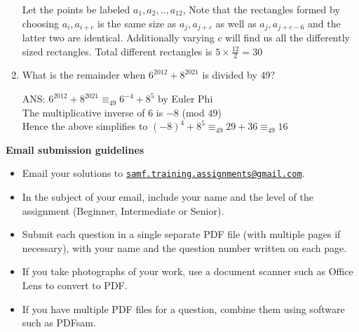 \documentclass{article}
\begin{document}
\begin{enumerate}[1.]
Let the points be labeled $a_1,a_2,..,a_{12}$, Note that the rectangles formed by choosing $a_i,a_{i+c}$ is the same size as $a_j,a_{j+c}$ as well as $a_j,a_{j+c-6}$ and the latter two are identical. Additionally varying $c$ will find us all the differently sized rectangles. Total different rectangles is $5\times\frac{12}{2} = 30$

\vspace{6pt}
\item %
What is the remainder when $6^{2012} + 8^{2021}$ is divided by 49?
\medskip
\item[ANS:]
$6^{2012} + 8^{2021} \equiv_{49} 6^{-4} + 8^{5}$ by Euler Phi\\
The multiplicative inverse of $6$ is $-8$ (mod $49$)\\
Hence the above simplifies to $(-8)^{4} + 8^{5}\equiv_{49} 29+36 \equiv_{49} 16$


\end{enumerate}

\vspace{8pt}
\textbf{\Large Email submission guidelines}
\begin{itemize}
	\item Email your solutions to \href{mailto:samf.training.assignments@gmail.com}{\texttt{samf.training.assignments@gmail.com}}.
	\item In the subject of your email, include your name and the level of the assignment (Beginner, Intermediate or Senior).
	\item Submit each question in a single separate PDF file (with multiple pages if necessary), with your name and the question number written on each page.
	\item If you take photographs of your work, use a document scanner such as Office Lens to convert to PDF.
	\item If you have multiple PDF files for a question, combine them using software such as PDFsam.
\end{itemize}
\end{document}
